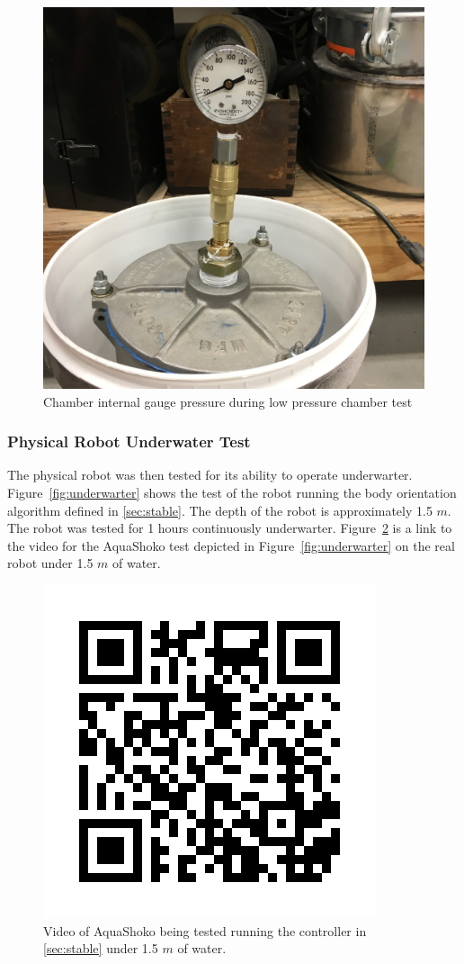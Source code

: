\begin{figure}[h]
\centering
\includegraphics[width=0.75\columnwidth]{./img/aquaPod-test-two-pressureCheck.JPG}
\caption{Chamber internal gauge pressure during low pressure chamber test}
\label{fig:test two pressure check-1}
\end{figure}

\subsubsection{Physical Robot Underwater Test}
The physical robot was then tested for its ability to operate underwarter.  
Figure~\ref{fig:underwarter} shows the test of the robot running the body orientation algorithm defined in \ref{sec:stable}.
The depth of the robot is approximately 1.5 $m$.
The robot was tested for 1 hours continuously underwarter.
Figure~\ref{fig:video} is a link to the video for the AquaShoko test depicted in Figure~\ref{fig:underwarter} on the real robot under 1.5 $m$ of water.








\begin{figure}[h]
\centering
\includegraphics[width=1.0\columnwidth]{./img/qr.jpg}
\caption{Video of AquaShoko being tested running the controller in \ref{sec:stable} under 1.5 $m$ of water.}
\label{fig:video}
\end{figure}